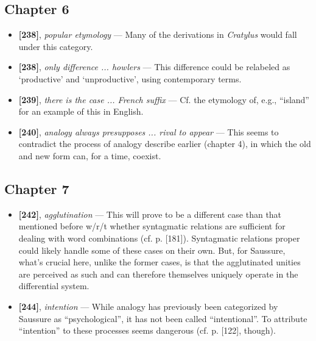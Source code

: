 \documentclass[12pt]{article}
\begin{document}
\subsection{Chapter 6}

\begin{itemize}

\item \textbf{[238]}, \textit{popular etymology} --- Many of the derivations in \textit{Cratylus} would fall under this category.

\item \textbf{[238]}, \textit{only difference ... howlers} --- This difference could be relabeled as `productive' and `unproductive', using contemporary terms. 

\item \textbf{[239]}, \textit{there is the case ... French suffix} --- Cf. the etymology of, e.g., ``island'' for an example of this in English.

\item \textbf{[240]}, \textit{analogy always presupposes ... rival to appear} --- This seems to contradict the process of analogy describe earlier (chapter 4), in which the old and new form can, for a time, coexist.

\end{itemize}

\subsection{Chapter 7}

\begin{itemize}

\item \textbf{[242]}, \textit{agglutination} --- This will prove to be a different case than that mentioned before w/r/t whether syntagmatic relations are sufficient for dealing with word combinations (cf. p. [181]). Syntagmatic relations proper could likely handle some of these cases on their own. But, for Saussure, what's crucial here, unlike the former cases, is that the agglutinated unities are perceived as such and can therefore themselves uniquely operate in the differential system.

\item \textbf{[244]}, \textit{intention} --- While analogy has previously been categorized by Saussure as ``psychological'', it has not been called ``intentional''. To attribute ``intention'' to these processes seems dangerous (cf. p. [122], though).

\end{itemize}
\end{document}
